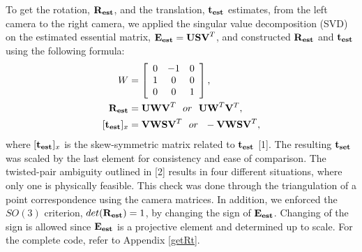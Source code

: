 \documentclass[12pt]{article} %
\begin{document}
\noindent To get the rotation, ${\bf R_{est}}$, and the translation, ${\bf t_{est}}$ estimates, from the left camera to the right camera, we applied the singular value decomposition (SVD) on the estimated essential matrix, ${\bf E_{est}} = {\bf USV}^T$, and constructed ${\bf R_{est}}$ and ${\bf t_{est}}$ using the following formula:
\begin{equation*}
	\begin{aligned}
		W &=
		\left[\begin{array}{ccc}
			0 & -1 & 0\\
			1 & 0 & 0\\
			0 & 0 & 1\\
		\end{array}
		\right],\\
		{\bf R_{est}} &= {\bf UWV}^T\ \ or\ \ {\bf UW}^T{\bf V}^T,\\
		[{\bf t_{est}}]_x &= {\bf VWSV}^T\ \ or\ \ -{\bf VWSV}^T,\\
	\end{aligned}
\end{equation*}
where $[{\bf t_{est}}]_x$ is the skew-symmetric matrix related to ${\bf t_{est}}$ [1]. The resulting ${\bf t_{set}}$ was scaled by the last element for consistency and ease of comparison. The twisted-pair ambiguity outlined in [2] results in four different situations, where only one is physically feasible. This check was done through the triangulation of a point correspondence using the camera matrices. In addition, we enforced the $SO(3)$ criterion, $det({\bf R_{est}}) = 1$, by changing the sign of ${\bf E_{est}}$. Changing of the sign is allowed since ${\bf E_{est}}$ is a projective element and determined up to scale. For the complete code, refer to Appendix \ref{getRt}.\\
\end{document}
